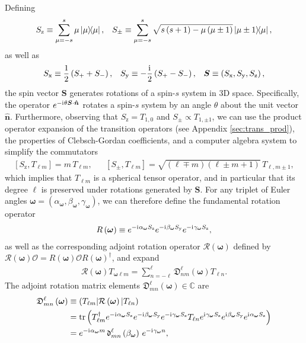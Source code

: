 \documentclass[notitlepage,twocolumn]{revtex4-2}
\newcommand{\f}[2]{\dfrac{#1}{#2}} %
\newcommand{\p}[1]{\left(#1\right)} %
\renewcommand{\sp}[1]{\left[#1\right]} %
\renewcommand{\v}{\bm} %
\newcommand{\uv}[1]{\bm{\hat{#1}}} %
\renewcommand{\i}{\mathrm{i}\mkern1mu} %
\newcommand{\1}{\mathds{1}}
\newcommand{\x}{\text{x}}
\newcommand{\y}{\text{y}}
\newcommand{\z}{\text{z}}
\renewcommand{\O}{\mathcal{O}}
\newcommand{\R}{\mathcal{R}}
\newcommand{\D}{\mathfrak{D}}
\renewcommand{\dd}{\mathfrak{d}}
\newcommand{\CC}{\mathbb{C}}
\def\obk#1{\mathinner{({#1})}}
\begin{document}
Defining
\begin{align}
  S_\z \equiv \sum_{\mu=-s}^s \mu \op{\mu},
  &&
  S_\pm \equiv \sum_{\mu=-s}^s
  \sqrt{s\p{s+1}-\mu\p{\mu\pm1}} \op{\mu\pm1}{\mu},
\end{align}
as well as
\begin{align}
  S_\x \equiv \f12\p{S_+ + S_-},
  &&
  S_\y \equiv -\f\i2\p{S_+-S_-},
  &&
  \v S \equiv \p{S_\x,S_\y,S_\z},
\end{align}
the spin vector $\v S$ generates rotations of a spin-$s$ system in 3D space.
Specifically, the operator $e^{-\i\theta\v S\cdot\uv n}$ rotates a spin-$s$ system by an angle $\theta$ about the unit vector $\uv n$.
Furthermore, observing that $S_\z=T_{1,0}$ and $S_\pm\propto T_{1,\pm1}$, we can use the product operator expansion of the transition operators (see Appendix \ref{sec:trans_prod}), the properties of Clebsch-Gordan coefficients, and a computer algebra system to simplify the commutators
\begin{align}
  \sp{S_\z,T_{\ell m}} = m\, T_{\ell m},
  &&
  \sp{S_\pm,T_{\ell m}} = \sqrt{\p{\ell\mp m}\p{\ell\pm m+1}}\, T_{\ell,m\pm1},
\end{align}
which implies that $T_{\ell m}$ is a spherical tensor operator, and in particular that its degree $\ell$ is preserved under rotations generated by $\v S$.
For any triplet of Euler angles $\v\omega=\p{\alpha_{\v\omega},\beta_{\v\omega},\gamma_{\v\omega}}$, we can therefore define the fundamental rotation operator
\begin{align}
  R\p{\v\omega} \equiv e^{-\i\alpha_{\v\omega}S_\z} e^{-\i\beta_{\v\omega}S_\y} e^{-\i\gamma_{\v\omega}S_\z},
\end{align}
as well as the corresponding adjoint rotation operator $\R\p{\v\omega}$ defined by $\R\p{\v\omega}\O = R\p{\v\omega} \O R\p{\v\omega}^\dag$, and expand
\begin{align}
  \R\p{\v\omega} T_{\v\omega\ell m}
  = \sum_{n=-\ell}^\ell \D_{nm}^\ell\p{\v\omega} T_{\ell n}.
\end{align}
The adjoint rotation matrix elements $\D_{mn}^\ell\p{\v\omega}\in\CC$ are
\begin{align}
  \D_{mn}^\ell\p{\v\omega}
  &\equiv \obk{T_{\ell m}|\R\p{\v\omega}|T_{\ell n}} \\
  &= \tr\p{T_{\ell m}^\dag e^{-\i\alpha_{\v\omega}S_\z} e^{-\i\beta_{\v\omega}S_\y} e^{-\i\gamma_{\v\omega}S_\z} T_{\ell n}
    e^{\i\gamma_{\v\omega}S_\z} e^{\i\beta_{\v\omega}S_\y} e^{\i\alpha_{\v\omega}S_\z}} \\
  &= e^{-\i\alpha_{\v\omega} m} \,\dd_{mn}^\ell\p{\beta_{\v\omega}}\, e^{-\i\gamma_{\v\omega} n},
\end{align}
\end{document}
